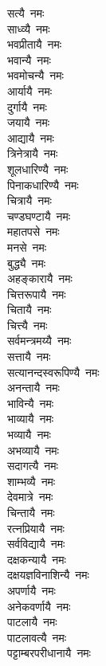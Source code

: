 \begin{multicols}{2}
\begin{flushleft}
सत्यै~नमः\\
साध्व्यै~नमः\\
भवप्रीतायै~नमः\\
भवान्यै~नमः\\
भवमोचन्यै~नमः\\
आर्यायै~नमः\\
दुर्गायै~नमः\\
जयायै~नमः\\
आद्यायै~नमः\\
त्रिनेत्रायै~नमः\hfill{}\\
शूलधारिण्यै~नमः\\
पिनाकधारिण्यै~नमः\\
चित्रायै~नमः\\
चण्डघण्टायै~नमः\\
महातपसे~नमः\\
मनसे~नमः\\
बुद्ध्यै~नमः\\
अहङ्कारायै~नमः\\
चित्तरूपायै~नमः\\
चितायै~नमः\hfill{}\\
चित्त्यै~नमः\\
सर्वमन्त्रमय्यै~नमः\\
सत्तायै~नमः\\
सत्यानन्दस्वरूपिण्यै~नमः\\
अनन्तायै~नमः\\
भाविन्यै~नमः\\
भाव्यायै~नमः\\
भव्यायै~नमः\\
अभव्यायै~नमः\\
सदागत्यै~नमः\hfill{}\\
शाम्भव्यै~नमः\\
देवमात्रे~नमः\\
चिन्तायै~नमः\\
रत्नप्रियायै~नमः\\
सर्वविद्यायै~नमः\\
दक्षकन्यायै~नमः\\
दक्षयज्ञविनाशिन्यै~नमः\\
अपर्णायै~नमः\\
अनेकवर्णायै~नमः\\
पाटलायै~नमः\hfill{}\\
पाटलावत्यै~नमः\\
पट्टाम्बरपरीधानायै~नमः\\

\end{flushleft}
\end{multicols}
